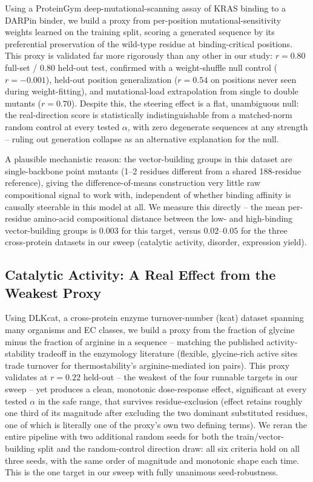 \documentclass{article}
\begin{document}
Using a ProteinGym deep-mutational-scanning assay of KRAS binding to a
DARPin binder, we build a proxy from per-position mutational-sensitivity
weights learned on the training split, scoring a generated sequence by
its preferential preservation of the wild-type residue at
binding-critical positions. This proxy is validated far more rigorously
than any other in our study: $r=0.80$ full-set / $0.80$ held-out test,
confirmed with a weight-shuffle null control ($r=-0.001$), held-out
position generalization ($r=0.54$ on positions never seen during
weight-fitting), and mutational-load extrapolation from single to double
mutants ($r=0.70$). Despite this, the steering effect is a flat,
unambiguous null: the real-direction score is statistically
indistinguishable from a matched-norm random control at every tested
$\alpha$, with zero degenerate sequences at any strength -- ruling out
generation collapse as an alternative explanation for the null.

A plausible mechanistic reason: the vector-building groups in this
dataset are single-backbone point mutants (1--2 residues different from
a shared 188-residue reference), giving the difference-of-means
construction very little raw compositional signal to work with,
independent of whether binding affinity is causally steerable in this
model at all. We measure this directly -- the mean per-residue
amino-acid compositional distance between the low- and high-binding
vector-building groups is $0.003$ for this target, versus $0.02$--$0.05$
for the three cross-protein datasets in our sweep (catalytic activity,
disorder, expression yield).

\subsection{Catalytic Activity: A Real Effect from the Weakest Proxy}

Using DLKcat, a cross-protein enzyme turnover-number (kcat) dataset
spanning many organisms and EC classes, we build a proxy from the
fraction of glycine minus the fraction of arginine in a sequence --
matching the published activity-stability tradeoff in the enzymology
literature (flexible, glycine-rich active sites trade turnover for
thermostability's arginine-mediated ion pairs). This proxy validates at
$r=0.22$ held-out -- the weakest of the four runnable targets in our
sweep -- yet produces a clean, monotonic dose-response effect,
significant at every tested $\alpha$ in the safe range, that survives
residue-exclusion (effect retains roughly one third of its magnitude
after excluding the two dominant substituted residues, one of which is
literally one of the proxy's own two defining terms). We reran the
entire pipeline with two additional random seeds for both the
train/vector-building split and the random-control direction draw: all
six criteria hold on all three seeds, with the same order of magnitude
and monotonic shape each time. This is the one target in our sweep with
fully unanimous seed-robustness.
\end{document}
